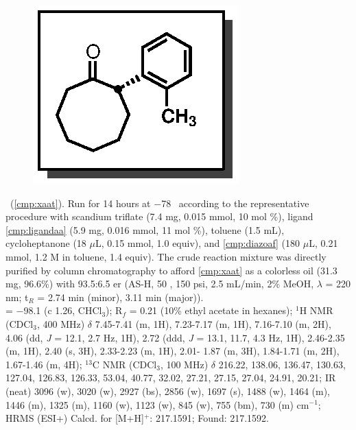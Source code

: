 \pagebreak
\begin{figure}
  \vspace{-12pt}
  \begin{center}
    \includegraphics[scale=0.8]{chp_asymmetric/images/xaat}
  \end{center}
  \vspace{-25pt}
\end{figure}\noindent \textbf{\CMPxaat}\ (\ref{cmp:xaat}). Run for 14 hours
at $-$78 \degc\  according to the representative procedure with scandium
triflate (7.4 mg, 0.015 mmol, 10 mol \%), ligand \ref{cmp:ligandaa} (5.9 mg, 0.016 mmol, 11
mol \%), toluene (1.5 mL), cycloheptanone (18 $\mu$L, 0.15 mmol, 1.0 equiv), and
\ref{cmp:diazoaf} (180 $\mu$L, 0.21 mmol, 1.2 M in toluene, 1.4 equiv). The
crude reaction mixture was directly purified by column chromatography to afford
\ref{cmp:xaat} as a colorless oil (31.3 mg, 96.6\%) with 93.5:6.5 er (AS-H, 50
\degc, 150 psi, 2.5 mL/min, 2\% MeOH, $\lambda$ = 220 nm; t$_R$ = 2.74 min
(minor), 3.11 min (major)). \\
\rotation = $-$98.1 (c 1.26, CHCl$_3$); R$_f$ = 0.21 (10\% ethyl acetate in
hexanes); $^1$H NMR (CDCl$_3$, 400 MHz) $\delta$ 7.45-7.41 (m, 1H), 7.23-7.17
(m, 1H), 7.16-7.10 (m, 2H), 4.06 (dd, \textit{J} = 12.1, 2.7 Hz, 1H), 2.72 (ddd,
\textit{J} = 13.1, 11.7, 4.3 Hz, 1H), 2.46-2.35 (m, 1H), 2.40 (s, 3H), 2.33-2.23
(m, 1H), 2.01- 1.87 (m, 3H), 1.84-1.71 (m, 2H), 1.67-1.46 (m, 4H); $^{13}$C NMR
(CDCl$_3$, 100	MHz) $\delta$ 216.22,	138.06,	136.47, 130.63, 127.04, 126.83,
126.33, 53.04, 40.77, 32.02, 27.21, 27.15, 27.04, 24.91, 20.21; IR (neat) 3096
(w), 3020 (w), 2927 (bs), 2856 (w), 1697 (s), 1488 (w), 1464 (m), 1446 (m), 1325
(m), 1160 (w), 1123 (w), 845 (w), 755 (bm), 730 (m) cm$^{-1}$; HRMS (ESI+)
Calcd. for  [M+H]$^+$: 217.1591; Found: 217.1592.  \\
